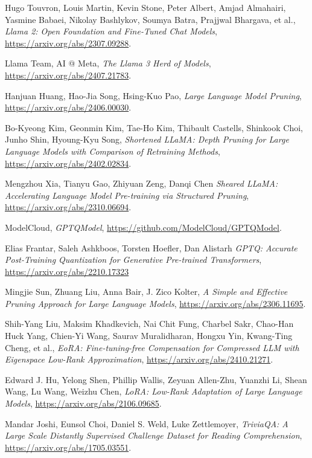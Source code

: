 \begin{thebibliography}{9}
	Hugo Touvron, Louis Martin, Kevin Stone, Peter Albert, Amjad Almahairi, Yasmine Babaei, Nikolay Bashlykov, Soumya Batra, Prajjwal Bhargava, et al.,
	\textit{Llama 2: Open Foundation and Fine-Tuned Chat Models},
	\url{https://arxiv.org/abs/2307.09288}.

	Llama Team, AI @ Meta,
	\textit{The Llama 3 Herd of Models},
	\url{https://arxiv.org/abs/2407.21783}.

	Hanjuan Huang, Hao-Jia Song, Hsing-Kuo Pao,
	\textit{Large Language Model Pruning},
	\url{https://arxiv.org/abs/2406.00030}.

	Bo-Kyeong Kim, Geonmin Kim, Tae-Ho Kim, Thibault Castells, Shinkook Choi, Junho Shin, Hyoung-Kyu Song,
	\textit{Shortened LLaMA: Depth Pruning for Large Language Models with Comparison of Retraining Methods},
	\url{https://arxiv.org/abs/2402.02834}.

	Mengzhou Xia, Tianyu Gao, Zhiyuan Zeng, Danqi Chen
	\textit{Sheared LLaMA: Accelerating Language Model Pre-training via Structured Pruning},
	\url{https://arxiv.org/abs/2310.06694}.

	ModelCloud,
	\textit{GPTQModel},
	\url{https://github.com/ModelCloud/GPTQModel}.

	Elias Frantar, Saleh Ashkboos, Torsten Hoefler, Dan Alistarh
	\textit{GPTQ: Accurate Post-Training Quantization for Generative Pre-trained Transformers},
	\url{https://arxiv.org/abs/2210.17323}

	Mingjie Sun, Zhuang Liu, Anna Bair, J. Zico Kolter,
	\textit{A Simple and Effective Pruning Approach for Large Language Models},
	\url{https://arxiv.org/abs/2306.11695}.

	Shih-Yang Liu, Maksim Khadkevich, Nai Chit Fung, Charbel Sakr, Chao-Han Huck Yang, Chien-Yi Wang, Saurav Muralidharan, Hongxu Yin, Kwang-Ting Cheng, et al.,
	\textit{EoRA: Fine-tuning-free Compensation for Compressed LLM with Eigenspace Low-Rank Approximation},
	\url{https://arxiv.org/abs/2410.21271}.

	Edward J. Hu, Yelong Shen, Phillip Wallis, Zeyuan Allen-Zhu, Yuanzhi Li, Shean Wang, Lu Wang, Weizhu Chen,
	\textit{LoRA: Low-Rank Adaptation of Large Language Models},
	\url{https://arxiv.org/abs/2106.09685}.

	Mandar Joshi, Eunsol Choi, Daniel S. Weld, Luke Zettlemoyer,
	\textit{TriviaQA: A Large Scale Distantly Supervised Challenge Dataset for Reading Comprehension},
	\url{https://arxiv.org/abs/1705.03551}.


\end{thebibliography}
